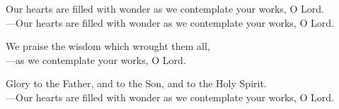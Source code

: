 \responsory

\noindent Our hearts are filled with wonder as we contemplate your works, O Lord.\\
{\color{red}---\thinspace}Our hearts are filled with wonder as we contemplate your works, O Lord.

\medskip\noindent We praise the wisdom which wrought them all,\\
{\color{red}---\thinspace}as we contemplate your works, O Lord.

\medskip\noindent Glory to the Father, and to the Son, and to the Holy Spirit.\\
{\color{red}---\thinspace}Our hearts are filled with wonder as we contemplate your works, O Lord.